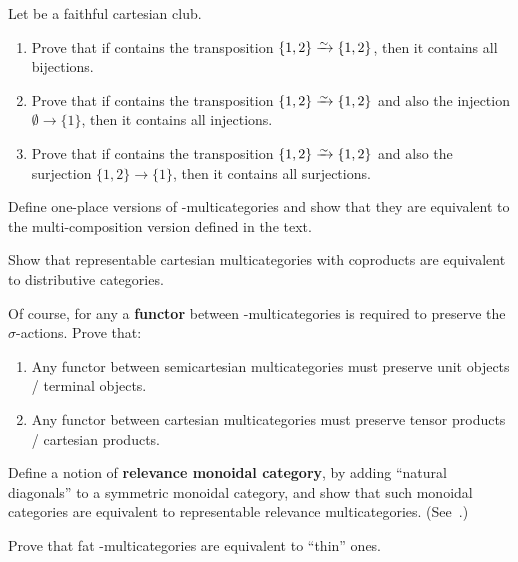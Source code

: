 \documentclass{book}
\begin{document}
\begin{ex}\label{ex:club-generators}
  Let \fS be a faithful cartesian club.
  \begin{enumerate}
  \item Prove that if \fS contains the transposition $\{1,2\}\toiso \{1,2\}$, then it contains all bijections.
  \item Prove that if \fS contains the transposition $\{1,2\}\toiso \{1,2\}$ and also the injection $\emptyset \to \{1\}$, then it contains all injections.
  \item Prove that if \fS contains the transposition $\{1,2\}\toiso \{1,2\}$ and also the surjection $\{1,2\} \to \{1\}$, then it contains all surjections.
  \end{enumerate}
\end{ex}

\begin{ex}\label{ex:cartmulti-oneplace}
  Define one-place versions of \fS-multicategories and show that they are equivalent to the multi-composition version defined in the text.
\end{ex}

\begin{ex}\label{ex:distrib}
  Show that representable cartesian multicategories with coproducts are equivalent to distributive categories.
\end{ex}

\begin{ex}\label{ex:absolute}
  Of course, for any \fS a \textbf{functor} between \fS-multicategories is required to preserve the $\sigma$-actions.
  Prove that:
  \begin{enumerate}
  \item Any functor between semicartesian multicategories must preserve unit objects / terminal objects.
  \item Any functor between cartesian multicategories must preserve tensor products / cartesian products.
  \end{enumerate}
\end{ex}

\begin{ex}\label{ex:relevance-moncat}
  Define a notion of \textbf{relevance monoidal category}, by adding ``natural diagonals'' to a symmetric monoidal category, and show that such monoidal categories are equivalent to representable relevance multicategories.
  (See~\cite{dp:relevant-cats}.)
\end{ex}

\begin{ex}\label{ex:fat-cartmulti}
  Prove that fat \fS-multicategories are equivalent to ``thin'' ones.
\end{ex}
\end{document}
